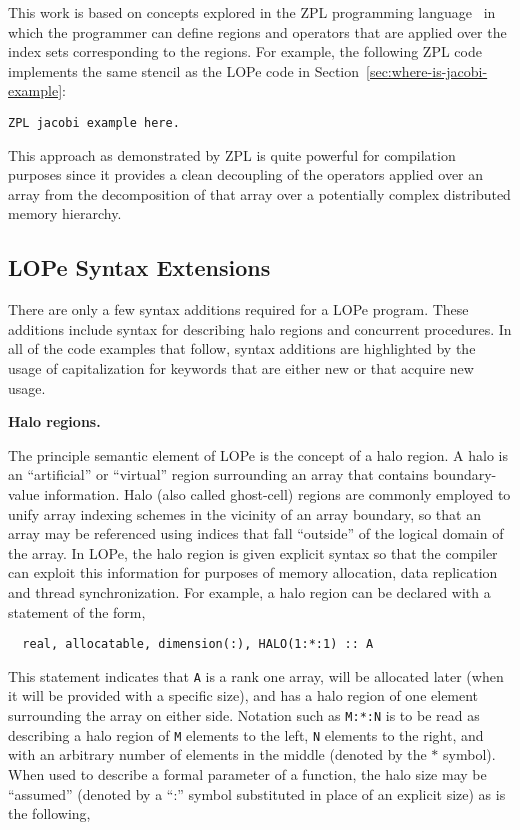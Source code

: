 This work is based on concepts explored in the ZPL programming
language~\cite{zpl1,zpl2} in which the programmer can define regions and 
operators that are applied over the index sets corresponding to the regions.
For example, the following ZPL code implements the same stencil as the
LOPe code in Section~\ref{sec:where-is-jacobi-example}:

\begin{verbatim}
ZPL jacobi example here.
\end{verbatim}

This approach as demonstrated by ZPL is quite powerful for compilation
purposes since it provides a clean decoupling of the operators applied
over an array from the decomposition of that array over a potentially
complex distributed memory hierarchy.  

\subsection{LOPe Syntax Extensions}

There are only a few syntax additions required for a LOPe program.
These additions include syntax for describing halo regions and
concurrent procedures.  In all of the code examples that follow,
syntax additions are highlighted by the usage of capitalization for
keywords that are either new or that acquire new usage.

\textbf{Halo regions.}

The principle semantic element of LOPe is the concept of a halo
region.  A halo is an ``artificial'' or ``virtual'' region surrounding
an array that contains boundary-value information.  Halo (also called
ghost-cell) regions are commonly employed to unify array indexing
schemes in the vicinity of an array boundary, so that an array may be
referenced using indices that fall ``outside'' of the logical domain
of the array.  In LOPe, the halo region is given explicit syntax so
that the compiler can exploit this information for purposes of memory
allocation, data replication and thread synchronization.  For example,
a halo region can be declared with a statement of the form,

\begin{verbatim}
  real, allocatable, dimension(:), HALO(1:*:1) :: A
\end{verbatim}

This statement indicates that \texttt{A} is a rank one array, will be
allocated later (when it will be provided with a specific size), and
has a halo region of one element surrounding the array on either side.
Notation such as \texttt{M:*:N} is to be read as describing a halo
region of \texttt{M} elements to the left, \texttt{N} elements to the
right, and with an arbitrary number of elements in the middle (denoted
by the $*$ symbol).  When used to describe a formal parameter of a
function, the halo size may be ``assumed'' (denoted by a ``:'' symbol
substituted in place of an explicit size) as is the following,

